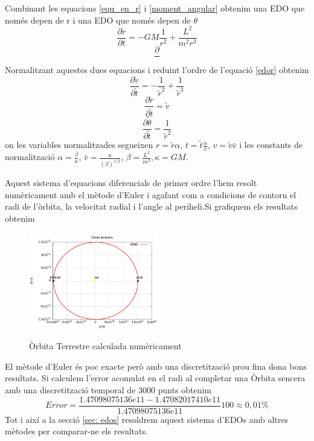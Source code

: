 \documentclass[11pt]{article}
\begin{document}
Combinant les equacions \eqref{equ_en_r} i \eqref{moment_angular} obtenim una EDO que només depen de r i una EDO que només depen de $\theta$
\begin{equation}
    \frac{\partial\dot{r}}{\partial t}=-GM\frac{1}{r^2}+\frac{L^2}{m^2r^3}
    \label{edor}
\end{equation}
\begin{equation}
    \frac{\partial}{}
    \label{edot}
\end{equation}
Normalitzant aquestes dues equacions i reduint l'ordre de l'equació \eqref{edor} obtenim
\begin{equation}
    \frac{\partial\tilde{v}}{\partial\tilde{t}}=-\frac{1}{\tilde{r}^2}+\frac{1}{\tilde{r}^3}
    \label{1_edo_r}
\end{equation}
\begin{equation}
    \frac{\partial\tilde{r}}{\partial\tilde{t}}=\tilde{v}
    \label{2_edo_r}
\end{equation}
\begin{equation}
    \frac{\partial\tilde{\theta}}{\partial\tilde{t}}=\frac{1}{\tilde{r}^2}
    \label{edo_tetha}
\end{equation}
on les variables normalitzades segueixen $r=\tilde{r}\alpha$, $t=\tilde{t}\frac{\alpha}{\bar{v}}$, $v=\tilde{v}\bar{v}$ i les constants de normalització $\alpha = \frac{\beta}{\kappa}$, $\bar{v}=\frac{\kappa}{(\beta)^{1/2}}$, $\beta=\frac{L^2}{m^2}, \kappa=GM$.

Aquest sistema d'equacions diferencials de primer ordre l'hem resolt numèricament amb el mètode d'Euler i agafant com a condicions de contorn el radi de l'òrbita, la velocitat radial i l'angle al periheli.\footnotemark[\value{footnote}]
Si grafiquem els resultats obtenim
\begin{figure}[h]
    \centering
    \includegraphics[width=0.5\textwidth]{orbita.png}
    \label{orb_terra}
    \caption{Òrbita Terrestre calculada numèricament}
\end{figure}

El mètode d'Euler és poc exacte però amb una discretització prou fina dona bons resultats. Si calculem l'error acomulat en el radi al completar una Òrbita sencera amb una discretització temporal de $3000$ punts obtenim
\begin{equation}
    Error = \frac{1.47098075136e11-1.47082017410e11}{1.47098075136e11}100\approx0,01\%
\end{equation}
Tot i així a la secció \ref{sec: edos} resoldrem aquest sistema d'EDOs amb altres mètodes per comparar-ne els resultats.
\end{document}
